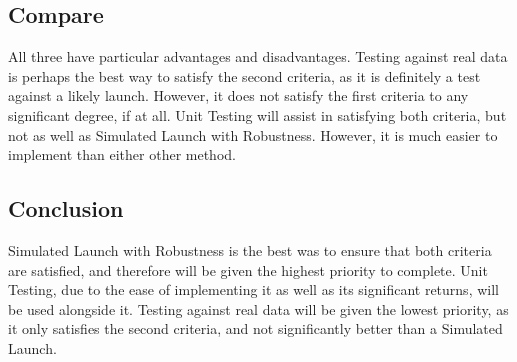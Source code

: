 \documentclass[onecolumn, draftclsnofoot,10pt, compsoc]{IEEEtran}
\begin{document}
\subsection{Compare}
All three have particular advantages and disadvantages. Testing against real data is perhaps the best way to satisfy the second criteria, as it is definitely a test against a likely launch. However, it does not satisfy the first criteria to any significant degree, if at all. Unit Testing will assist in satisfying both criteria, but not as well as Simulated Launch with Robustness. However, it is much easier to implement than either other method.
\subsection{Conclusion}
Simulated Launch with Robustness is the best was to ensure that both criteria are satisfied, and therefore will be given the highest priority to complete. Unit Testing, due to the ease of implementing it as well as its significant returns, will be used alongside it. Testing against real data will be given the lowest priority, as it only satisfies the second criteria, and not significantly better than a Simulated Launch.
\end{document}
